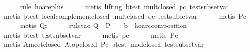 \begin{isabellebody}
%
\isadelimproof
\ \ \ \ %
\endisadelimproof
%
\isatagproof
{}\isamarkupfalse%
\ {}rule\ hoare{}plus{}\isanewline
\ \ \ \ \isamarkupfalse%
\ {}metis\ {}lifting{}\ b{}test\ mult{}closed\ pc\ test{}subset{}var{}\isanewline
\ \ \ \ \isamarkupfalse%
\ {}metis\ b{}test\ local{}complement{}closed\ mult{}closed\ qc\ test{}subset{}var{}\isanewline
\ \ \ \ \isamarkupfalse%
\ {}metis\ Pc{}\isanewline
\ \ \ \ \isamarkupfalse%
\ {}metis\ Qc{}\isanewline
\ \ \ \ \isamarkupfalse%
\ {}rule{}tac\ Q\ {}\ {}P\ {}\ {}{}\ {}\ b{}{}\ \ hoare{}composition{}\isanewline
\ \ \ \ \isamarkupfalse%
\ {}metis\ b{}test\ test{}subset{}var{}\isanewline
\ \ \ \ \isamarkupfalse%
\ {}metis\ pc{}\isanewline
\ \ \ \ \isamarkupfalse%
\ {}metis\ Pc{}\isanewline
\ \ \ \ \isamarkupfalse%
\ {}metis\ A{}meet{}closed\ A{}top{}closed\ Pc\ b{}test\ mod{}closed\ test{}subset{}var{}\isanewline

\end{isabellebody}
